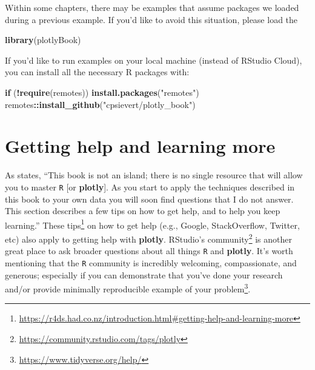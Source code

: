 \documentclass[
  12pt,
]{krantz}
\newenvironment{Shaded}{\begin{snugshade}}{\end{snugshade}}
\newcommand{\ControlFlowTok}[1]{\textcolor[rgb]{0.13,0.29,0.53}{\textbf{#1}}}
\newcommand{\KeywordTok}[1]{\textcolor[rgb]{0.13,0.29,0.53}{\textbf{#1}}}
\newcommand{\NormalTok}[1]{#1}
\newcommand{\OperatorTok}[1]{\textcolor[rgb]{0.81,0.36,0.00}{\textbf{#1}}}
\newcommand{\StringTok}[1]{\textcolor[rgb]{0.31,0.60,0.02}{#1}}
\renewcommand{\href}[2]{#2\footnote{\url{#1}}}
\begin{document}
Within some chapters, there may be examples that assume packages we loaded during a previous example. If you'd like to avoid this situation, please load the

\begin{Shaded}
\begin{Highlighting}[]
\KeywordTok{library}\NormalTok{(plotlyBook)}
\end{Highlighting}
\end{Shaded}

If you'd like to run examples on your local machine (instead of RStudio Cloud), you can install all the necessary R packages with:

\begin{Shaded}
\begin{Highlighting}[]
\ControlFlowTok{if}\NormalTok{ (}\OperatorTok{!}\KeywordTok{require}\NormalTok{(remotes)) }\KeywordTok{install.packages}\NormalTok{(}\StringTok{"remotes"}\NormalTok{)}
\NormalTok{remotes}\OperatorTok{::}\KeywordTok{install_github}\NormalTok{(}\StringTok{"cpsievert/plotly_book"}\NormalTok{)}
\end{Highlighting}
\end{Shaded}

\hypertarget{getting-help-and-learning-more}{%
\section{Getting help and learning more}\label{getting-help-and-learning-more}}

As \citet{r4ds} states, ``This book is not an island; there is no single resource that will allow you to master \texttt{R} {[}or \textbf{plotly}{]}. As you start to apply the techniques described in this book to your own data you will soon find questions that I do not answer. This section describes a few tips on how to get help, and to help you keep learning.'' \href{https://r4ds.had.co.nz/introduction.html\#getting-help-and-learning-more}{These tips} on how to get help (e.g., Google, StackOverflow, Twitter, etc) also apply to getting help with \textbf{plotly}. \href{https://community.rstudio.com/tags/plotly}{RStudio's community} is another great place to ask broader questions about all things \texttt{R} and \textbf{plotly}. It's worth mentioning that the \texttt{R} community is incredibly welcoming, compassionate, and generous; especially if you can demonstrate that you've done your research and/or \href{https://www.tidyverse.org/help/}{provide minimally reproducible example of your problem}.
\end{document}
